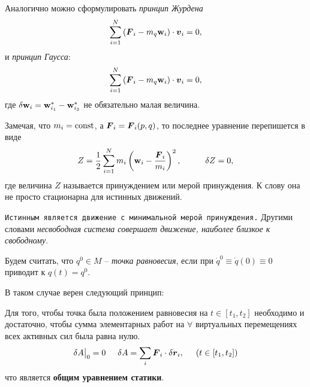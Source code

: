 Аналогично можно сформулировать \textit{принцип Журдена}
\begin{equation}
    \sum_{i=1}^N \left(
        \mbox{\boldmath $F$}_i - m_q \mbox{\boldmath $\mathrm{w}$}_i
    \right) \cdot \mbox{\boldmath $v$}_i = 0,
\end{equation}
и \textit{принцип Гаусса}:
\begin{equation}
    \sum_{i=1}^N \left(
        \mbox{\boldmath $F$}_i - m_q \mbox{\boldmath $\mathrm{w}$}_i
    \right) \cdot \mbox{\boldmath $v$}_i = 0,
\end{equation}
где $\delta \mbox{\boldmath $\mathrm{w}$}_i = \mbox{\boldmath $\mathrm{w}$}^*_{i_1} - \mbox{\boldmath $\mathrm{w}$}^*_{i_2}$ не обязательно малая величина. 

Замечая, что $m_i = \text{const}$, а $\mbox{\boldmath $F$}_i = \mbox{\boldmath $F$}_i (p, q)$, то последнее уравнение перепишется в виде
\begin{equation*}
    Z = \frac{1}{2} \sum_{i=1}^N m_i 
    \left(
        \mbox{\boldmath $\mathrm{w}$}_i - \frac{\mbox{\boldmath $F$}_i}{m_i} 
    \right)^2,
    \hspace{1cm} 
    \delta Z = 0,
\end{equation*}
где величина $Z$ называется принуждением или мерой принуждения. К слову она не просто стационарна для истинных движений. 

\texttt{Истинным является движение с минимальной мерой принуждения.} Другими словами \textit{несвободная система совершает движение, наиболее близкое к свободному}. 

\begin{to_def} 
    Будем считать, что $q^0 \in M$ -- \textit{точка равновесия}, если при $\dot{q}^0 \equiv \dot{q}(0) \equiv 0$ приводит к $q(t) = q^0$. 
\end{to_def}

В таком случае верен следующий принцип:

\begin{to_thr}
    Для того, чтобы точка была положением равновесия на $t \in [t_1, t_2]$ необходимо и достаточно, чтобы сумма элементарных работ на $\forall$ виртуальных перемещениях всех активных сил была равна нулю.
    \begin{equation}
        \delta A \big|_0 = 0 
        \hspace{0.5cm} 
        \delta A = \sum_i \mbox{\boldmath $F$}_i \cdot \delta \mbox{\boldmath $r$}_i,
        \hspace{0.5cm} (t\in[t_1, t_2])
    \end{equation}
    что является \textbf{общим уравнением статики}.
\end{to_thr}

